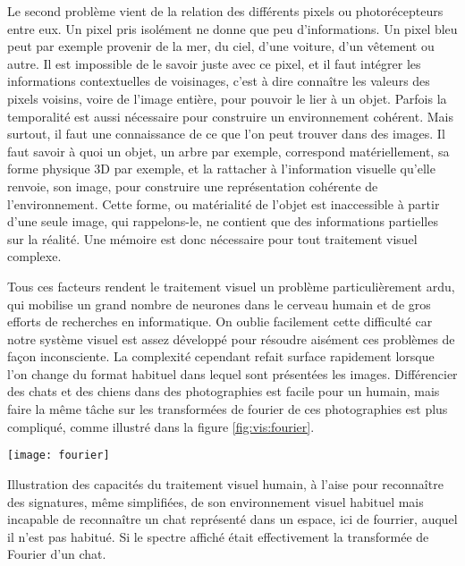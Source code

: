	Le second problème vient de la relation des différents pixels ou photorécepteurs entre eux. Un pixel pris isolément ne donne que peu d'informations. Un pixel bleu peut par exemple provenir de la mer, du ciel, d'une voiture, d'un vêtement ou autre. Il est impossible de le savoir juste avec ce pixel, et il faut intégrer les informations contextuelles de voisinages, c'est à dire connaître les valeurs des pixels voisins, voire de l'image entière, pour pouvoir le lier à un objet. Parfois la temporalité est aussi nécessaire pour construire un environnement cohérent. Mais surtout, il faut une connaissance de ce que l'on peut trouver dans des images. Il faut savoir à quoi un objet, un arbre par exemple, correspond matériellement, sa forme physique 3D par exemple, et la rattacher à l'information visuelle qu'elle renvoie, son image, pour construire une représentation cohérente de l'environnement. Cette forme, ou matérialité de l'objet est inaccessible à partir d'une seule image, qui rappelons-le, ne contient que des informations partielles sur la réalité. Une mémoire est donc nécessaire pour tout traitement visuel complexe.

	Tous ces facteurs rendent le traitement visuel un problème particulièrement ardu, qui mobilise un grand nombre de neurones dans le cerveau humain et de gros efforts de recherches en informatique. On oublie facilement cette difficulté car notre système visuel est assez développé pour résoudre aisément ces problèmes de façon inconsciente. La complexité cependant refait surface rapidement lorsque l'on change du format habituel dans lequel sont présentées les images. Différencier des chats et des chiens dans des photographies est facile pour un humain, mais faire la même tâche sur les transformées de fourier de ces photographies est plus compliqué, comme illustré dans la figure \ref{fig:vis:fourier}.

	\begin{figureth}
		\texttt{[image: fourier]}
		\caption[Illustration de l'efficacité du traitement visuel humain.]{Illustration des capacités du traitement visuel humain, à l'aise pour reconnaître des signatures, même simplifiées, de son environnement visuel habituel mais incapable de reconnaître un chat représenté dans un espace, ici de fourrier, auquel il n'est pas habitué. Si le spectre affiché était effectivement la transformée de Fourier d'un chat.\footnotemark}\label{fig:vis:fourier}
	\end{figureth}


